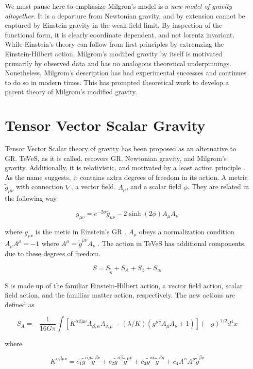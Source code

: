\documentclass[12pt]{article}
\begin{document}
We must pause here to emphasize Milgron's model is a \emph{new model of gravity altogether}. It is a departure from Newtonian gravity, and by extension cannot be captured by Einstein gravity in the weak field limit. By inspection of the functional form, it is clearly coordinate dependent, and not lorentz invariant. While Einstein's theory can follow from first principles by extremzing the Einstein-Hilbert action, Milgrom's modified gravity by itself is motivated primarily by observed data and has no analogous theoretical underpinnings. Nonetheless, Milgrom's description has had experimental successes and continues to do so in modern times. This has prompted theoretical work to develop a parent theory of Milgrom's modified gravity.

\section{Tensor Vector Scalar Gravity}
Tensor Vector Scalar theory of gravity has been proposed as an alternative to GR. TeVeS, as it is called, recovers GR, Newtonian gravity, and Milgrom's gravity. Additionally, it is relativistic, and motivated by a least action principle \cite{Bekenstein2004}. As the name suggests, it contains extra degrees of freedom in its action. A metric $\tilde{g}_{\mu \nu}$ with connection $\tilde{\nabla}$, a vector field, $A_{\mu}$, and a scalar field $\phi$. They are related in the following way

$$ g_{\mu \nu} = e^{-2 \phi} \tilde{g}_{\mu \nu} - 2\sinh (2\phi) A_{\mu} A_{\nu}$$

where $ g_{\mu \nu}$ is the metic in Einstein's GR \cite{Bekenstein2006}. $A_{\mu}$ obeys a normalization condition $A_{\mu} A^{\mu} = -1$ where $ A^{\mu} = \tilde{g}^{\mu \nu} A_{\nu}$ \cite{masud2014}. The action in TeVeS has additional components, due to these degrees of freedom.

$$ S = S_{\tilde{g}} + S_{A} + S_{\phi} + S_{m} $$

S is made up of the familiar Einstein-Hilbert action, a vector field action, scalar field action, and the familiar matter action, respectively. The new actions are defined as

$$ S_{A} = -\frac{1}{16G\pi} \int [K^{\alpha \beta \mu \nu} A_{\beta, \alpha} A_{\nu, \mu} - (\lambda/K)(g^{\mu \nu} A_{\mu} A_{\nu} + 1 )]  (-g)^{1/2} d^{4}x$$

where

$$ K^{\alpha \beta \mu \nu} = c_{1}\tilde{g}^{\alpha \mu} \tilde{g}^{\beta \nu}+ c_{2}\tilde{g}^{\alpha \beta} \tilde{g}^{\mu \nu} + c_{3}\tilde{g}^{\alpha \nu} \tilde{g}^{\beta \mu} + c_{4} A^{\alpha} A^{\mu} \tilde{g}^{\beta \nu}$$
\end{document}
